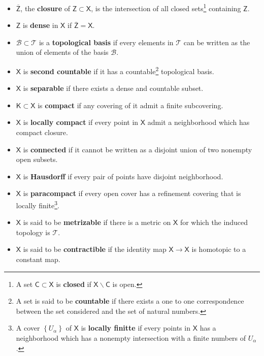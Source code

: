 \documentclass[10pt]{book}
\newcommand{\Bcal}{\mathcal{B}}
\newcommand{\Tcal}{\mathcal{T}}
\newcommand{\Csf}{\mathsf{C}}
\newcommand{\Ksf}{\mathsf{K}}
\newcommand{\Xsf}{\mathsf{X}}
\newcommand{\Zsf}{\mathsf{Z}}
\theoremstyle{break}
\begin{document}
\begin{itemize}
%
\item $\overline{\Zsf}$, the \textbf{closure} of $\Zsf \subset \Xsf$, is the intersection of all closed sets\footnote{A set $\Csf \subset \Xsf$ is \textbf{closed} if $\Xsf \backslash \Csf$ is open.} containing $\Zsf$.%
%
\item $\Zsf$ is \textbf{dense} in $\Xsf$ if $\overline{\Zsf} = \Xsf$.%
%
\item $\Bcal \subset \Tcal$ is a \textbf{topological basis} if every elements in $\Tcal$ can be written as the union of elements of the basis $\Bcal$.%
%
\item $\Xsf$ is \textbf{second countable} if it has a countable\footnote{A set is said to be \textbf{countable} if there exists a one to one correspondence between the set considered and the set of natural numbers.} topological basis.%
%
\item $\Xsf$ is \textbf{separable} if there exists a dense and countable subset.%
%
\item $\Ksf \subset \Xsf$ is \textbf{compact} if any covering of it admit a finite subcovering.%
%
\item $\Xsf$ is \textbf{locally compact} if every point in $\Xsf$ admit a neighborhood which has compact closure.%
%
\item $\Xsf$ is \textbf{connected} if it cannot be written as a disjoint union of two nonempty open subsets.%
%
\item $\Xsf$ is \textbf{Hausdorff} if every pair of points have disjoint neighborhood.%
%
\item $\Xsf$ is \textbf{paracompact} if every open cover has a refinement covering that is locally finite\footnote{A cover $\left\{U_\alpha\right\}$ of $\Xsf$ is \textbf{locally finitte} if every points in $\Xsf$ has a neighborhood which has a nonempty intersection with a finite numbers of $U_\alpha$.}.%
%
\item $\Xsf$ is said to be \textbf{metrizable} if there is a metric on $\Xsf$ for which the induced topology is $\Tcal$.
%
\item $\Xsf$ is said to be \textbf{contractible} if the identity map $\Xsf \to \Xsf$ is homotopic to a constant map.
\end{itemize}
\end{document}
